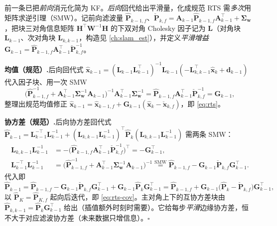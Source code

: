 \begin{derivation}
前一条已把\emph{前向}消元化简为 KF。\emph{后向}回代给出平滑量，化成规范 RTS 需\emph{多次}用矩阵求逆引理（SMW）。记前向滤波量 $\hat{\mathbf{P}}_{k-1,f}$、$\check{\mathbf{P}}_{k,f}=\mathbf{A}_{k-1}\hat{\mathbf{P}}_{k-1,f}\mathbf{A}_{k-1}^\top+\boldsymbol{\Sigma}_{\mathbf{w}}$，把块三对角信息矩阵 $\mathbf{H}^\top\mathbf{W}^{-1}\mathbf{H}$ 的下双对角 Cholesky 因子记为 $\mathbf{L}$（对角块 $\mathbf{L}_{k-1}$、次对角块 $\mathbf{L}_{k,k-1}$，构造见 \cref{ch:slam_est}），并定义\emph{平滑增益} $\mathbf{G}_{k-1}=\hat{\mathbf{P}}_{k-1,f}\mathbf{A}_{k-1}^\top\check{\mathbf{P}}_{k,f}^{-1}$。

\textbf{均值（规范）.}\;后向回代式 $\hat{\mathbf{x}}_{k-1}=(\mathbf{L}_{k-1}\mathbf{L}_{k-1}^\top)^{-1}\mathbf{L}_{k-1}(-\mathbf{L}_{k,k-1}^\top\hat{\mathbf{x}}_k+\mathbf{d}_{k-1})$ 代入因子块、用一次 SMW
\[
  \big(\hat{\mathbf{P}}_{k-1,f}^{-1}+\mathbf{A}_{k-1}^\top\boldsymbol{\Sigma}_{\mathbf{w}}^{-1}\mathbf{A}_{k-1}\big)^{-1}\mathbf{A}_{k-1}^\top\boldsymbol{\Sigma}_{\mathbf{w}}^{-1}
  =\hat{\mathbf{P}}_{k-1,f}\mathbf{A}_{k-1}^\top\check{\mathbf{P}}_{k,f}^{-1}=\mathbf{G}_{k-1},
\]
整理出规范均值修正 $\hat{\mathbf{x}}_{k-1}=\hat{\mathbf{x}}_{k-1,f}+\mathbf{G}_{k-1}(\hat{\mathbf{x}}_k-\check{\mathbf{x}}_{k,f})$，即 \cref{eq:rts}。

\textbf{协方差（规范）.}\;后向协方差回代式 $\hat{\mathbf{P}}_{k-1}=\mathbf{L}_{k-1}^{-\top}\mathbf{L}_{k-1}^{-1}+(\mathbf{L}_{k,k-1}\mathbf{L}_{k-1}^{-1})^\top\hat{\mathbf{P}}_k(\mathbf{L}_{k,k-1}\mathbf{L}_{k-1}^{-1})$ 需两条 SMW：
\begin{align*}
  \mathbf{L}_{k,k-1}\mathbf{L}_{k-1}^{-1}&=-\big(\hat{\mathbf{P}}_{k-1,f}\mathbf{A}_{k-1}^\top\check{\mathbf{P}}_{k,f}^{-1}\big)^\top=-\mathbf{G}_{k-1}^\top,\\
  \mathbf{L}_{k-1}^{-\top}\mathbf{L}_{k-1}^{-1}&=\big(\hat{\mathbf{P}}_{k-1,f}^{-1}+\mathbf{A}_{k-1}^\top\boldsymbol{\Sigma}_{\mathbf{w}}^{-1}\mathbf{A}_{k-1}\big)^{-1}
  \overset{\text{SMW}}{=}\hat{\mathbf{P}}_{k-1,f}-\mathbf{G}_{k-1}\check{\mathbf{P}}_{k,f}\mathbf{G}_{k-1}^\top.
\end{align*}
代入即
\[
  \hat{\mathbf{P}}_{k-1}=\hat{\mathbf{P}}_{k-1,f}-\mathbf{G}_{k-1}\check{\mathbf{P}}_{k,f}\mathbf{G}_{k-1}^\top+\mathbf{G}_{k-1}\hat{\mathbf{P}}_k\mathbf{G}_{k-1}^\top
  =\hat{\mathbf{P}}_{k-1,f}+\mathbf{G}_{k-1}\big(\hat{\mathbf{P}}_k-\check{\mathbf{P}}_{k,f}\big)\mathbf{G}_{k-1}^\top,
\]
以 $\hat{\mathbf{P}}_K=\hat{\mathbf{P}}_{K,f}$ 起向后迭代，即 \cref{eq:rts-cov}。主对角上下的互协方差块由 $\hat{\mathbf{P}}_{k,k-1}=\hat{\mathbf{P}}_k\mathbf{G}_{k-1}^\top$ 给出（插值额外时刻时需要）\cite{barfoot2024state}。它给每步\emph{平滑}边缘协方差，恒不大于对应滤波协方差（未来数据只增信息）。\hfill$\square$
\end{derivation}

